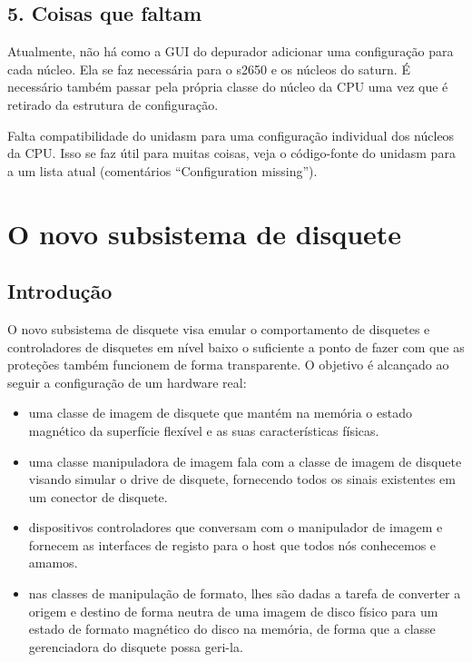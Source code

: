 \documentclass[letterpaper,10pt,brazil]{sphinxmanual}
\begin{document}
\subsection{5. Coisas que faltam}
\label{techspecs/device_disasm_interface:coisas-que-faltam}
Atualmente, não há como a GUI do depurador adicionar
uma configuração para cada núcleo. Ela se faz necessária para o s2650 e
os núcleos do saturn. É necessário também passar pela própria classe do
núcleo da CPU uma vez que é retirado da estrutura de configuração.

Falta compatibilidade do unidasm para uma configuração individual dos
núcleos da CPU. Isso se faz útil para muitas coisas, veja o código-fonte
do unidasm para a um lista atual (comentários ``Configuration missing'').
\clearpage

\section{O novo subsistema de disquete}
\label{techspecs/floppy:o-novo-subsistema-de-disquete}\label{techspecs/floppy::doc}

\subsection{Introdução}
\label{techspecs/floppy:introducao}
O novo subsistema de disquete visa emular o comportamento de disquetes e
controladores de disquetes em nível baixo o suficiente a ponto de fazer
com que as proteções também funcionem de forma transparente. O objetivo
é alcançado ao seguir a configuração de um hardware real:
\begin{itemize}
\item {} 
uma classe de imagem de disquete que mantém na memória o estado
magnético da superfície flexível e as suas características físicas.

\item {} 
uma classe manipuladora de imagem fala com a classe de imagem de
disquete visando simular o drive de disquete, fornecendo todos os
sinais existentes em um conector de disquete.

\item {} 
dispositivos controladores que conversam com o manipulador de imagem e
fornecem as interfaces de registo para o host que todos nós conhecemos
e amamos.

\item {} 
nas classes de manipulação de formato, lhes são dadas a tarefa de
converter a origem e destino de forma neutra de uma imagem de disco
físico para um estado de formato magnético do disco na memória,
de forma que a classe gerenciadora do disquete possa geri-la.

\end{itemize}
\end{document}
